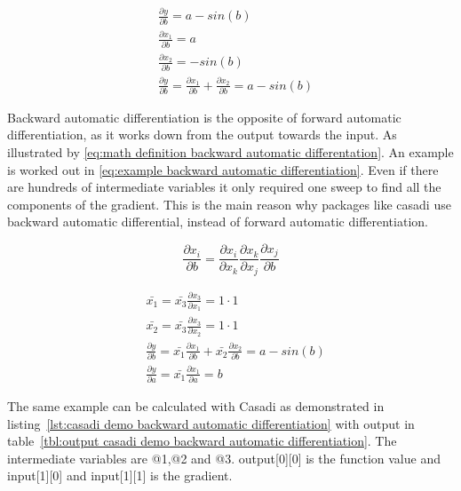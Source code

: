 \begin{equation}
	\begin{aligned}
		& \frac{\partial y}{\partial b} = a - sin(b) \\
		& \frac{\partial x_1}{\partial b} = a  \\
		& \frac{\partial x_2}{\partial b} = -sin(b) \\
		& \frac{\partial y}{\partial b} = \frac{\partial x_1}{\partial b} + \frac{\partial x_2}{\partial b}	 = a - sin(b)
	\end{aligned}
	\label{eq:example forward automatic differentiation}
\end{equation}

Backward automatic differentiation is the opposite of forward automatic differentiation, as it works down from the output towards the input. As illustrated by \eqref{eq:math definition backward automatic differentation}. An example is worked out in \eqref{eq:example backward automatic differentiation}. Even if there are hundreds of intermediate variables it only required one sweep to find all the components of the gradient. This is the main reason why packages like casadi use backward automatic differential, instead of forward automatic differentiation.

\begin{equation}
	\frac{\partial x_i}{\partial b} = \frac{\partial x_i}{\partial x_k}\frac{\partial x_k}{\partial x_j}\frac{\partial x_j}{\partial b}
	\label{eq:math definition backward automatic differentation}
\end{equation}

\begin{equation}
\begin{aligned}
& \bar{x_1} = \bar{x_3} \frac{\partial x_3}{\partial x_1} = 1 \cdot 1 \\
& \bar{x_2} = \bar{x_3} \frac{\partial x_3}{\partial x_2} = 1 \cdot 1 \\
& \frac{\partial y}{\partial b} = \bar{x_1} \frac{\partial x_1}{\partial b} + \bar{x_2} \frac{\partial x_2}{\partial b} = a - sin(b)\\
& \frac{\partial y}{\partial a} = \bar{x_1} \frac{\partial x_1}{\partial a} = b
\end{aligned}
\label{eq:example backward automatic differentiation}
\end{equation}

The same example can be calculated with Casadi as demonstrated in listing~\ref{lst:casadi demo backward automatic differentiation} with output in table~\ref{tbl:output casadi demo backward automatic differentiation}. The intermediate variables are @1,@2 and @3. output[0][0] is the function value and input[1][0] and input[1][1] is the gradient. 

